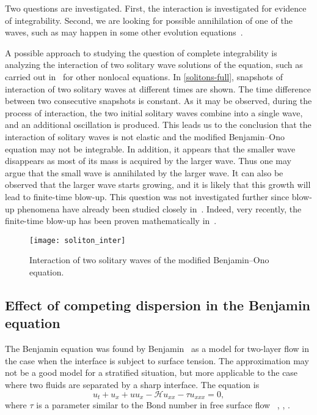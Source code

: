 Two questions are investigated. First, the interaction is investigated for evidence
of integrability. Second, we are looking for possible annihilation of one of the waves,
such as may happen in some other evolution equations~\cite{Tjon}.



A possible approach to studying the question of complete integrability
is analyzing the interaction of two solitary wave solutions of the equation, 
such as carried out in~\cite{HK,HKJB} for other nonlocal equations.	
In \autoref{solitons-full}, snapshots of interaction of two solitary waves at different times are shown.
The time difference between two consecutive snapshots is constant.    
As it may be observed, during the process of interaction, the two initial solitary waves combine 
into a single wave, and an additional oscillation is produced. 
This leads us to the conclusion that the interaction of solitary waves is not elastic 
and the modified Benjamin--Ono equation may not be integrable. 
In addition, it appears that the smaller wave disappears as most of its
mass is acquired by the larger wave. Thus one may argue that the small
wave is annihilated by the larger wave. It can also be observed that
the larger wave starts growing, and it is likely that this growth
will lead to finite-time blow-up. This question was not investigated further
since blow-up phenomena have already been studied closely in~\cite{HKJB}.
Indeed, very recently, the finite-time blow-up 
has been proven mathematically in~\cite{MP}.


\begin{figure}[t]
\centering
		\texttt{[image: soliton\_inter]}      
\caption{\small Interaction of two solitary waves of the modified Benjamin--Ono equation.}
\label{solitons-full}
\end{figure} 



\subsection{Effect of competing dispersion in the Benjamin equation}
\label{Benjamin_eq}
The Benjamin equation was found by Benjamin~\cite{B3} as a model for two-layer flow in the case
when the interface is subject to surface tension. The approximation may not be a good model for
a stratified situation, but more applicable to the case where two fluids are separated by a
sharp interface. 
The equation is 
\begin{equation}\label{benjamin}
u_t + u_x + uu_x - \mathcal{H} u_{xx} - \tau u_{xxx} = 0,
\end{equation}
where $\tau$ is a parameter similar to the Bond number in free surface flow~
\cite{B3}, \cite{KalischBenjamin}, \cite{Walsh2014a}.
	
